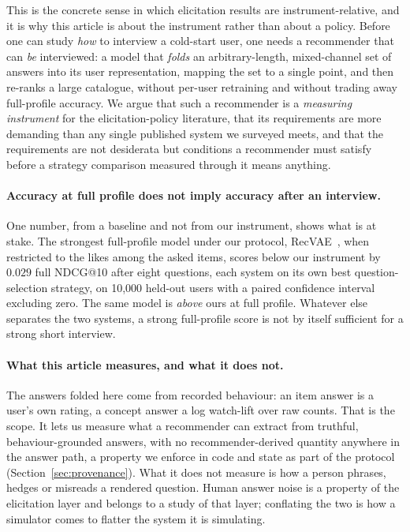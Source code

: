 \documentclass[manuscript,screen,review]{acmart}
\begin{document}
This is the concrete sense in which elicitation results are instrument-relative, and it is why this article is about the instrument rather than about a policy. Before one can study \emph{how} to interview a cold-start user, one needs a recommender that can \emph{be} interviewed: a model that \emph{folds} an arbitrary-length, mixed-channel set of answers into its user representation, mapping the set to a single point, and then re-ranks a large catalogue, without per-user retraining and without trading away full-profile accuracy. We argue that such a recommender is a \emph{measuring instrument} for the elicitation-policy literature, that its requirements are more demanding than any single published system we surveyed meets, and that the requirements are not desiderata but conditions a recommender must satisfy before a strategy comparison measured through it means anything.

\paragraph{Accuracy at full profile does not imply accuracy after an interview.} One number, from a baseline and not from our instrument, shows what is at stake. The strongest full-profile model under our protocol, RecVAE~\citep{ren2020recvae}, when restricted to the likes among the asked items, scores below our instrument by $0.029$ full NDCG@10 after eight questions, each system on its own best question-selection strategy, on 10,000 held-out users with a paired confidence interval excluding zero. The same model is \emph{above} ours at full profile. Whatever else separates the two systems, a strong full-profile score is not by itself sufficient for a strong short interview.

\paragraph{What this article measures, and what it does not.} The answers folded here come from recorded behaviour: an item answer is a user's own rating, a concept answer a log watch-lift over raw counts. That is the scope. It lets us measure what a recommender can extract from truthful, behaviour-grounded answers, with no recommender-derived quantity anywhere in the answer path, a property we enforce in code and state as part of the protocol (Section~\ref{sec:provenance}). What it does not measure is how a person phrases, hedges or misreads a rendered question. Human answer noise is a property of the elicitation layer and belongs to a study of that layer; conflating the two is how a simulator comes to flatter the system it is simulating.
\end{document}
